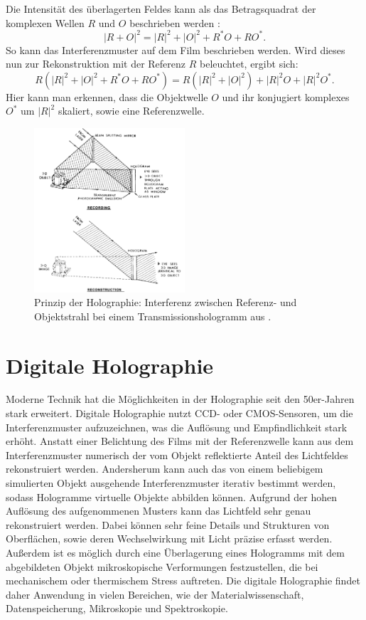 \documentclass[10pt,twocolumn,a4paper]{article}
\begin{document}
Die Intensität des überlagerten Feldes kann als das Betragsquadrat der komplexen Wellen $R$ und $O$ beschrieben werden \cite{DHM}:
\begin{equation}
    |R + O|^2 = |R|^2 + |O|^2 + R^* O + R O^*.
\end{equation}
So kann das Interferenzmuster auf dem Film beschrieben werden. Wird dieses nun zur Rekonstruktion mit der Referenz $R$ beleuchtet, ergibt sich:
\begin{equation}
    R(|R|^2 + |O|^2 + R^* O + R O^*) = R(|R|^2 + |O|^2) + |R|^2O + |R|^2O^*.
\end{equation}
Hier kann man erkennen, dass die Objektwelle $O$ und ihr konjugiert komplexes $O^*$ um $|R|^2$ skaliert, sowie eine Referenzwelle.

\begin{figure}
    \centering
    \includegraphics[width=0.5\textwidth]{images/holography.png}
    \caption{Prinzip der Holographie: Interferenz zwischen Referenz- und Objektstrahl bei einem Transmissionshologramm aus \cite{Gabor}.}
    \label{fig:holography}
\end{figure}

\section{Digitale Holographie}
Moderne Technik hat die Möglichkeiten in der Holographie seit den 50er-Jahren stark erweitert. Digitale Holographie nutzt CCD- oder CMOS-Sensoren, um die Interferenzmuster aufzuzeichnen, was die Auflösung und Empfindlichkeit stark erhöht. Anstatt einer Belichtung des Films mit der Referenzwelle kann aus dem Interferenzmuster numerisch der vom Objekt reflektierte Anteil des Lichtfeldes rekonstruiert werden. Andersherum kann auch das von einem beliebigem simulierten Objekt ausgehende Interferenzmuster iterativ bestimmt werden, sodass Hologramme virtuelle Objekte abbilden können. Aufgrund der hohen Auflösung des aufgenommenen Musters kann das Lichtfeld sehr genau rekonstruiert werden. Dabei können sehr feine Details und Strukturen von Oberflächen, sowie deren Wechselwirkung mit Licht präzise erfasst werden. Außerdem ist es möglich durch eine Überlagerung eines Hologramms mit dem abgebildeten Objekt mikroskopische Verformungen festzustellen, die bei mechanischem oder thermischem Stress auftreten. Die digitale Holographie findet daher Anwendung in vielen Bereichen, wie der Materialwissenschaft, Datenspeicherung, Mikroskopie und Spektroskopie.
\end{document}
